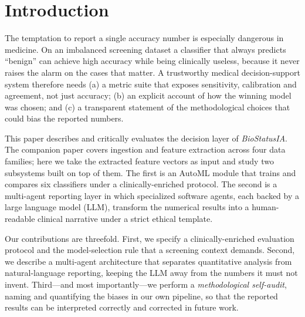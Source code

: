 \documentclass[10pt,twocolumn]{article}
\begin{document}
\section{Introduction}
The temptation to report a single accuracy number is especially dangerous in
medicine. On an imbalanced screening dataset a classifier that always predicts
``benign'' can achieve high accuracy while being clinically useless, because it
never raises the alarm on the cases that matter. A trustworthy medical
decision-support system therefore needs (a) a metric suite that exposes
sensitivity, calibration and agreement, not just accuracy; (b) an explicit
account of how the winning model was chosen; and (c) a transparent statement of
the methodological choices that could bias the reported numbers.

This paper describes and critically evaluates the decision layer of
\emph{BioStatusIA}. The companion paper covers ingestion and feature extraction
across four data families; here we take the extracted feature vectors as input
and study two subsystems built on top of them. The first is an AutoML module
that trains and compares six classifiers under a clinically-enriched protocol.
The second is a multi-agent reporting layer in which specialized software agents,
each backed by a large language model (LLM), transform the numerical results
into a human-readable clinical narrative under a strict ethical template.

Our contributions are threefold. First, we specify a clinically-enriched
evaluation protocol and the model-selection rule that a screening context
demands. Second, we describe a multi-agent architecture that separates
quantitative analysis from natural-language reporting, keeping the LLM away from
the numbers it must not invent. Third---and most importantly---we perform a
\emph{methodological self-audit}, naming and quantifying the biases in our own
pipeline, so that the reported results can be interpreted correctly and
corrected in future work.
\end{document}

